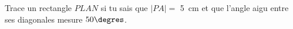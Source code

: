 %
%
	Trace un rectangle \(PLAN\) si tu sais que \(|PA| =\) \SI{5}{cm} et que l'angle aigu entre ses diagonales mesure \(50 \degres\).
